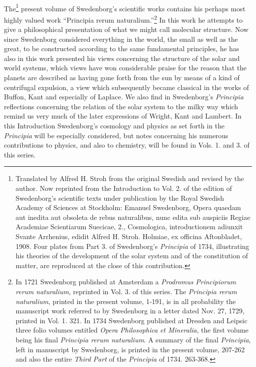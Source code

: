 \documentclass[a4paper, 11pt, oneside, polutonikogreek, english]{article}
\begin{document}
\paragraph{}
The\footnote{Translated by Alfred H. Stroh from the original Swedish and revised by the author. Now reprinted from the Introduction to Vol. 2. of the edition of Swedenborg's scientific texts under publication by the Royal Swedish Academy of Sciences at Stockholm: Emanuel Swedenborg, Opera quaedam aut inedita aut obsoleta de rebus naturalibus, nunc edita sub auspiciis Regiae Academiae Scientiarum Suecicae, 2., Cosmologica, introductionem adiunxit Svante Arrhenius, edidit Alfred H. Stroh. Holmiae, ex officina Aftonbladet, 1908. Four plates from Part 3. of Swedenborg's \emph{Principia} of 1734, illustrating his theories of the development of the solar system and of the constitution of matter, are reproduced at the close of this contribution.} present volume of Swedenborg's scientific works contains his perhaps most highly valued work ``Principia rerum naturalium.''\footnote{In 1721 Swedenborg published at Amsterdam a \emph{Prodromus Principiorum rerum naturalium}, reprinted in Vol. 3. of this series. The \emph{Principia rerum naturalium}, printed in the present volume, 1-191, is in all probability the manuscript work referred to by Swedenborg in a letter dated Nov. 27, 1729, printed in Vol. 1. 321. In 1734 Swedenborg published at Dresden and Leipsic three folio volumes entitled \emph{Opera Philosophica et Mineralia}, the first volume being his final \emph{Principia rerum naturalium}. A summary of the final \emph{Principia}, left in manuscript by Swedenborg, is printed in the present volume, 207-262 and also the entire \emph{Third Part} of the \emph{Principia} of 1734. 263-368.} In this work he attempts to give a philosophical presentation of what we might call molecular structure. Now since Swedenborg considered everything in the world, the small as well as the great, to be constructed according to the same fundamental principles, he has also in this work presented his views concerning the structure of the solar and world systems, which views have won considerable praise for the reason that the planets are described as having gone forth from the sun by means of a kind of centrifugal expulsion, a view which subsequently became classical in the works of Buffon, Kant and especially of Laplace. We also find in Swedenborg's \emph{Principia} reflections concerning the relation of the solar system to the milky way which remind us very much of the later expressions of Wright, Kant and Lambert. In this Introduction Swedenborg's cosmology and physics as set forth in the \emph{Principia} will be especially considered, but notes concerning his numerous contributions to physics, and also to chemistry, will be found in Vols. 1. and 3. of this series.
\end{document}
